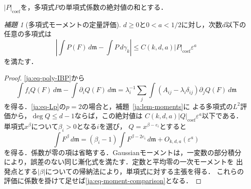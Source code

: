 \documentclass[12pt]{amsart}
\theoremstyle{definition}
\theoremstyle{remark}
\numberwithin{equation}{section}
\newcommand{\m}{\mathfrak m}
\theoremstyle{jpplain}
\newtheorem{jlem}[thm]{補題}
\begin{document}
$|P|_{\mathrm{coef}}$を，多項式$P$の単項式係数の絶対値の和とする．

\begin{jlem}[多項式モーメントの定量評価]\label{ja:lem-Gram}
$d\geq0$と$0<a<1/2$に対し，次数$d$以下の任意の多項式は
\begin{equation}\label{ja:eq-moment-comparison}
 \left|\int P(F)\,d\m-\int P\,d\gamma_k\right|
 \leq C(k,d,a)|P|_{\mathrm{coef}}\varepsilon^a
\end{equation}
を満たす．
\end{jlem}
\begin{proof}
\eqref{ja:eq-poly-IBP}から
\[
 \int f_iQ(F)\,d\m-\int\partial_iQ(F)\,d\m
 =\lambda_i^{-1}\sum_j\int
       (A_{ij}-\lambda_i\delta_{ij})\partial_jQ(F)\,d\m
\]
を得る．\eqref{ja:eq-Lp}の$p=2$の場合と，補題~\ref{ja:lem-moments}に
よる多項式の$L^2$評価から，$\deg Q\leq d-1$ならば，この絶対値は
$C(k,d,a)|Q|_{\mathrm{coef}}\varepsilon^a$以下である．
単項式$x^\beta$について$\beta_i>0$となる$i$を選び，
$Q=x^{\beta-e_i}$とすると
\[
 \int F^\beta\,d\m
 =(\beta_i-1)\int F^{\beta-2e_i}\,d\m+O_{k,d,a}(\varepsilon^a)
\]
を得る．係数が零の項は省略する．Gaussianモーメントは，一変数の部分積分
により，誤差のない同じ漸化式を満たす．定数と平均零の一次モーメントを
出発点とする$|\beta|$についての帰納法により，単項式に対する主張を得る．
これらの評価に係数を掛けて足せば\eqref{ja:eq-moment-comparison}となる．
\end{proof}
\end{document}
